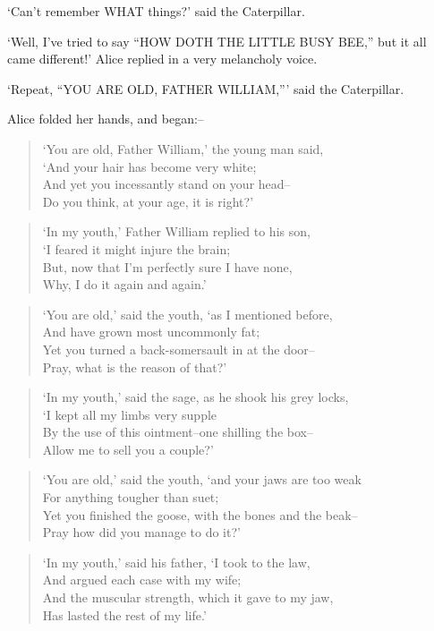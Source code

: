 \documentclass[12pt]{book}
\begin{document}
  `Can't remember WHAT things?' said the Caterpillar.

  `Well, I've tried to say ``HOW DOTH THE LITTLE BUSY BEE,'' but it
all came different!' Alice replied in a very melancholy voice.

  `Repeat, ``YOU ARE OLD, FATHER WILLIAM,''' said the Caterpillar.

  Alice folded her hands, and began:--

\begin{verse}
    `You are old, Father William,' the young man said,\\
      `And your hair has become very white;\\
    And yet you incessantly stand on your head--\\
      Do you think, at your age, it is right?'
\end{verse}
\begin{verse}
    `In my youth,' Father William replied to his son,\\
      `I feared it might injure the brain;\\
    But, now that I'm perfectly sure I have none,\\
      Why, I do it again and again.'
\end{verse}
\begin{verse}
    `You are old,' said the youth, `as I mentioned before,\\
      And have grown most uncommonly fat;\\
    Yet you turned a back-somersault in at the door--\\
      Pray, what is the reason of that?'
\end{verse}
\begin{verse}
    `In my youth,' said the sage, as he shook his grey locks,\\
      `I kept all my limbs very supple\\
    By the use of this ointment--one shilling the box--\\
      Allow me to sell you a couple?'
\end{verse}
\begin{verse}
    `You are old,' said the youth, `and your jaws are too weak\\
      For anything tougher than suet;\\
    Yet you finished the goose, with the bones and the beak--\\
      Pray how did you manage to do it?'
\end{verse}
\begin{verse}
    `In my youth,' said his father, `I took to the law,\\
      And argued each case with my wife;\\
    And the muscular strength, which it gave to my jaw,\\
      Has lasted the rest of my life.'
\end{verse}
\end{document}
